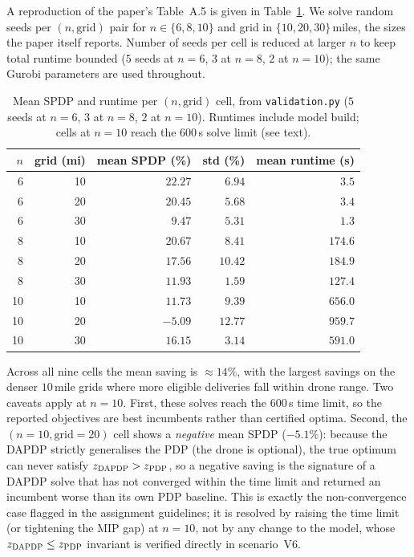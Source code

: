 \documentclass[11pt,a4paper]{article}
\newcommand{\dapdp}{\textsc{DAPDP}}
\newcommand{\pdp}{\textsc{PDP}}
\begin{document}
A reproduction of the paper's Table~A.5 is given in
Table~\ref{tab:validation}. We solve random seeds per $(n, \text{grid})$
pair for $n \in \{6, 8, 10\}$ and grid in $\{10, 20, 30\}$\,miles, the
sizes the paper itself reports. Number of seeds per cell is reduced at
larger $n$ to keep total runtime bounded ($5$ seeds at $n{=}6$, $3$ at
$n{=}8$, $2$ at $n{=}10$); the same Gurobi parameters are used throughout.

\begin{table}[h]
\centering
\caption{Mean SPDP and runtime per $(n, \text{grid})$ cell, from
\texttt{validation.py} ($5$ seeds at $n{=}6$, $3$ at $n{=}8$, $2$ at
$n{=}10$). Runtimes include model build; cells at $n{=}10$ reach the
$600$\,s solve limit (see text).}
\label{tab:validation}
\small
\begin{tabular}{@{}rrrrr@{}}
\toprule
$n$ & grid (mi) & mean SPDP (\%) & std (\%) & mean runtime (s) \\
\midrule
6  & 10 & $22.27$ & $6.94$ & $3.5$ \\
6  & 20 & $20.45$ & $5.68$ & $3.4$ \\
6  & 30 & $9.47$  & $5.31$ & $1.3$ \\
8  & 10 & $20.67$ & $8.41$ & $174.6$ \\
8  & 20 & $17.56$ & $10.42$ & $184.9$ \\
8  & 30 & $11.93$ & $1.59$ & $127.4$ \\
10 & 10 & $11.73$ & $9.39$ & $656.0$ \\
10 & 20 & $-5.09$ & $12.77$ & $959.7$ \\
10 & 30 & $16.15$ & $3.14$ & $591.0$ \\
\bottomrule
\end{tabular}
\end{table}

Across all nine cells the mean saving is $\approx 14\%$, with the largest
savings on the denser $10$\,mile grids where more eligible deliveries fall
within drone range. Two caveats apply at $n{=}10$. First, these solves reach
the $600$\,s time limit, so the reported objectives are best incumbents
rather than certified optima. Second, the $(n{=}10,\text{grid}{=}20)$ cell
shows a \emph{negative} mean SPDP ($-5.1\%$): because the \dapdp{} strictly
generalises the \pdp{} (the drone is optional), the true optimum can never
satisfy $z_{\dapdp}>z_{\pdp}$, so a negative saving is the signature of a
\dapdp{} solve that has not converged within the time limit and returned an
incumbent worse than its own \pdp{} baseline. This is exactly the
non-convergence case flagged in the assignment guidelines; it is resolved by
raising the time limit (or tightening the MIP gap) at $n{=}10$, not by any
change to the model, whose $z_{\dapdp}\le z_{\pdp}$ invariant is verified
directly in scenario~V6.
\end{document}
